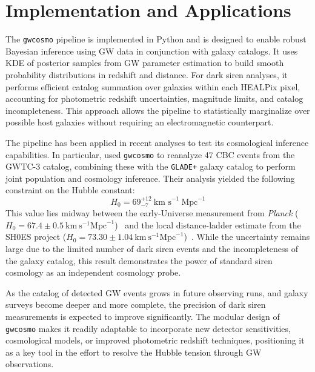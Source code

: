 \section{Implementation and Applications}

%

The \texttt{gwcosmo} pipeline is implemented in Python and is designed to enable robust Bayesian inference using \ac{GW} data in conjunction with galaxy catalogs. It uses \ac{KDE} of posterior samples from \ac{GW} parameter estimation to build smooth probability distributions in redshift and distance. For dark siren analyses, it performs efficient catalog summation over galaxies within each HEALPix pixel, accounting for photometric redshift uncertainties, magnitude limits, and catalog incompleteness. This approach allows the pipeline to statistically marginalize over possible host galaxies without requiring an electromagnetic counterpart.

The pipeline has been applied in recent analyses to test its cosmological inference capabilities. In particular, \citet{gray2023joint} used \texttt{gwcosmo} to reanalyze 47 \ac{CBC} events from the \ac{GWTC}-3 catalog, combining these with the \texttt{GLADE+} galaxy catalog to perform joint population and cosmology inference. Their analysis yielded the following constraint on the Hubble constant:
$$
H_0 = 69^{+12}_{-7}~\text{km s}^{-1}~\text{Mpc}^{-1}
$$
This value lies midway between the early-Universe measurement from \textit{Planck} ($H_0 = 67.4 \pm 0.5~\mathrm{km}~\mathrm{s}^{-1}\mathrm{Mpc}^{-1}$)~\citep{Planck:2018vyg} and the local distance-ladder estimate from the \ac{SH0ES} project ($H_0 = 73.30 \pm 1.04~\mathrm{km}~\mathrm{s}^{-1}\mathrm{Mpc}^{-1}$)~\citep{riess2022comprehensive}. While the uncertainty remains large due to the limited number of dark siren events and the incompleteness of the galaxy catalog, this result demonstrates the power of standard siren cosmology as an independent cosmology probe.

As the catalog of detected \ac{GW} events grows in future observing runs, and galaxy surveys become deeper and more complete, the precision of dark siren measurements is expected to improve significantly. The modular design of \texttt{gwcosmo} makes it readily adaptable to incorporate new detector sensitivities, cosmological models, or improved photometric redshift techniques, positioning it as a key tool in the effort to resolve the Hubble tension through \ac{GW} observations.
